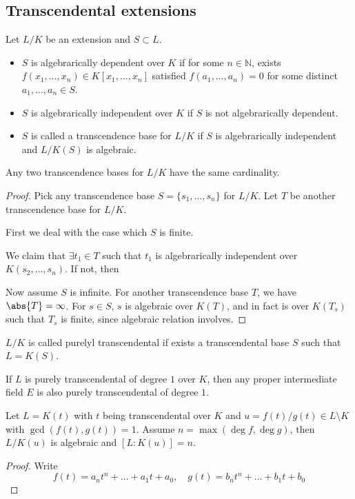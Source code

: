 \subsection{Transcendental extensions}

\begin{definition}
  Let $L/K$ be an extension and $S \subset L$.
  \begin{itemize}
    \item $S$ is algebrarically dependent over $K$ if for some $n \in \mathbb{N}$,
      exists $f(x_1, \dots, x_n) \in K[x_1, \dots, x_n]$ satisfied
      $f(a_1, \dots, a_n) = 0$ for some distinct $a_1, \dots, a_n \in S$.
    \item $S$ is algebrarically independent over $K$ if $S$ is not algebrarically dependent.
    \item $S$ is called a transcendence base for $L/K$ if $S$ is algebrarically independent
      and $L/K(S)$ is algebraic.
  \end{itemize}
\end{definition}

\begin{theorem}
  Any two transcendence bases for $L/K$ have the same cardinality.

  \begin{proof}
    Pick any transcendence base $S = \{s_1, \dots, s_n\}$ for $L/K$.
    Let $T$ be another transcendence base for $L/K$.

    First we deal with the case which $S$ is finite.

    We claim that $\exists t_1 \in T$ such that
    $t_1$ is algebrarically independent over $K(s_2, \dots, s_n)$.
    If not, then 

    Now assume $S$ is infinite.
    For another transcendence base $T$, we have $\abs{T} = \infty$.
    For $s \in S$, $s$ is algebraic over $K(T)$, and
    in fact is over $K(T_s)$ such that $T_s$ is finite,
    since algebraic relation involves.
  \end{proof}
\end{theorem}

\begin{definition}
  $L/K$ is called purelyl transcendental if exists a transcendental base $S$
  such that $L = K(S)$.
\end{definition}

\begin{theorem}
  If $L$ is purely transcendental of degree $1$ over $K$, then any proper
  intermediate field $E$ is also purely transcendental of degree $1$.
\end{theorem}

\begin{lemma}
  Let $L = K(t)$ with $t$ being transcendental over $K$ and $u = f(t) / g(t) \in L \setminus K$
  with $\gcd(f(t), g(t)) = 1$.
  Assume $n = \max(\deg f, \deg g)$, then $L/K(u)$ is algebraic and $[L: K(u)] = n$.
  \begin{proof}
    Write
    \[ f(t) = a_n t^n + \dots + a_1 t + a_0, \quad g(t) = b_n t^n + \dots + b_1 t + b_0 \]
  \end{proof}
\end{lemma}

